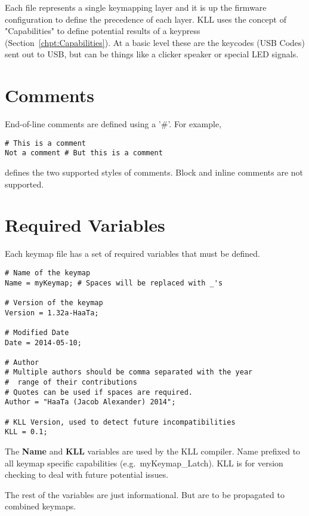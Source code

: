 \documentclass{kiibohd-template}
\begin{document}
Each file represents a single keymapping layer and it is up the firmware configuration to define the precedence of each layer.
KLL uses the concept of "Capabilities" to define potential results of a keypress (Section~\ref{chpt:Capabilities}).
At a basic level these are the keycodes (USB Codes) sent out to USB, but can be things like a clicker speaker or special LED signals.


\section{Comments}

End-of-line comments are defined using a '\#'.
For example,

\begin{lstlisting}
# This is a comment
Not a comment # But this is a comment
\end{lstlisting}

defines the two supported styles of comments.
Block and inline comments are not supported.


\section{Required Variables}

Each keymap file has a set of required variables that must be defined.

\begin{lstlisting}
# Name of the keymap
Name = myKeymap; # Spaces will be replaced with _'s

# Version of the keymap
Version = 1.32a-HaaTa;

# Modified Date
Date = 2014-05-10;

# Author
# Multiple authors should be comma separated with the year
#  range of their contributions
# Quotes can be used if spaces are required.
Author = "HaaTa (Jacob Alexander) 2014";

# KLL Version, used to detect future incompatibilities
KLL = 0.1;
\end{lstlisting}

The \textbf{Name} and \textbf{KLL} variables are used by the KLL compiler.
Name prefixed to all keymap specific capabilities (e.g.\ myKeymap\_Latch).
KLL is for version checking to deal with future potential issues.

The rest of the variables are just informational.
But are to be propagated to combined keymaps.


\end{document}
